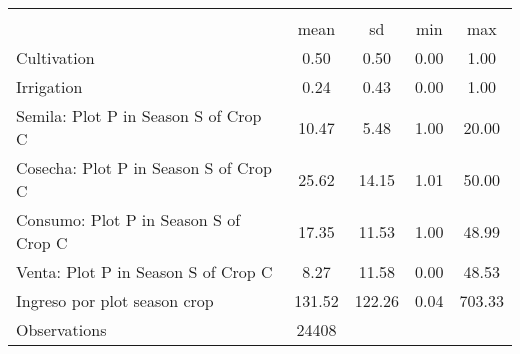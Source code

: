 {
\def\sym#1{\ifmmode^{#1}\else\(^{#1}\)\fi}
\begin{tabular}{l*{1}{cccc}}
\hline\hline
                    &\multicolumn{4}{c}{}                               \\
                    &        mean&          sd&         min&         max\\
\hline
Cultivation         &        0.50&        0.50&        0.00&        1.00\\
Irrigation          &        0.24&        0.43&        0.00&        1.00\\
Semila: Plot P in Season S of Crop C&       10.47&        5.48&        1.00&       20.00\\
Cosecha: Plot P in Season S of Crop C&       25.62&       14.15&        1.01&       50.00\\
Consumo: Plot P in Season S of Crop C&       17.35&       11.53&        1.00&       48.99\\
Venta: Plot P in Season S of Crop C&        8.27&       11.58&        0.00&       48.53\\
Ingreso por plot season crop&      131.52&      122.26&        0.04&      703.33\\
\hline
Observations        &       24408&            &            &            \\
\hline\hline
\end{tabular}
}
